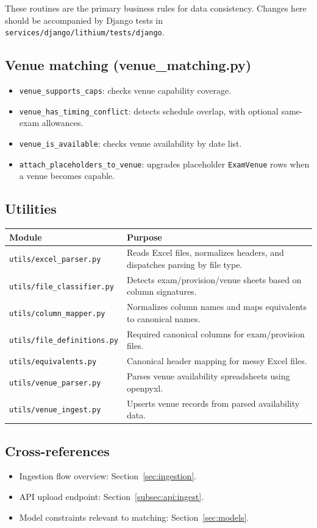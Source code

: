 These routines are the primary business rules for data consistency. Changes here should be accompanied by Django tests in \texttt{services/django/lithium/tests/django}.

\subsection{Venue matching (venue\_matching.py)}
\label{subsec:services:matching}

\begin{itemize}
  \item \texttt{venue\_supports\_caps}: checks venue capability coverage.
  \item \texttt{venue\_has\_timing\_conflict}: detects schedule overlap, with optional same-exam allowances.
  \item \texttt{venue\_is\_available}: checks venue availability by date list.
  \item \texttt{attach\_placeholders\_to\_venue}: upgrades placeholder \texttt{ExamVenue} rows when a venue becomes capable.
\end{itemize}

\subsection{Utilities}
\label{subsec:services:utils}

\begin{longtable}{p{}p{}}
\toprule
\textbf{Module} & \textbf{Purpose} \\
\midrule
\texttt{utils/excel\_parser.py} & Reads Excel files, normalizes headers, and dispatches parsing by file type. \\
\texttt{utils/file\_classifier.py} & Detects exam/provision/venue sheets based on column signatures. \\
\texttt{utils/column\_mapper.py} & Normalizes column names and maps equivalents to canonical names. \\
\texttt{utils/file\_definitions.py} & Required canonical columns for exam/provision files. \\
\texttt{utils/equivalents.py} & Canonical header mapping for messy Excel files. \\
\texttt{utils/venue\_parser.py} & Parses venue availability spreadsheets using openpyxl. \\
\texttt{utils/venue\_ingest.py} & Upserts venue records from parsed availability data. \\
\bottomrule
\end{longtable}

\subsection{Cross-references}
\label{subsec:services:links}

\begin{itemize}
  \item Ingestion flow overview: Section~\ref{sec:ingestion}.
  \item API upload endpoint: Section~\ref{subsec:api:ingest}.
  \item Model constraints relevant to matching: Section~\ref{sec:models}.
\end{itemize}
